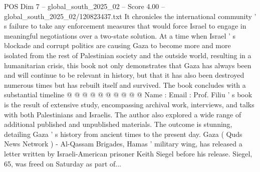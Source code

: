 \begin{textsample}{POS Dim 7 – global\_south\_2025\_02 – Score 4.00 – global\_south\_2025\_02/120823437.txt}
It chronicles the international community ' s failure to take any enforcement measures that would force Israel to engage in meaningful negotiations over a two-state solution.
At a time when Israel ' s blockade and corrupt politics are causing Gaza to become more and more isolated from the rest of Palestinian society and the outside world, resulting in a humanitarian crisis, this book not only demonstrates that Gaza has always been and will continue to be relevant in history, but that it has also been destroyed numerous times but has rebuilt itself and survived.
The book concludes with a substantial timeline @ @ @ @ @ @ @ @ @ @ Name : Email : Prof.
Filiu ' s book is the result of extensive study, encompassing archival work, interviews, and talks with both Palestinians and Israelis.
The author also explored a wide range of additional published and unpublished materials.
The outcome is stunning, detailing Gaza ' s history from ancient times to the present day.
Gaza ( Quds News Network ) - Al-Qassam Brigades, Hamas ' military wing, has released a letter written by Israeli-American prisoner Keith Siegel before his release.
Siegel, 65, was freed on Saturday as part of...

\end{textsample}
